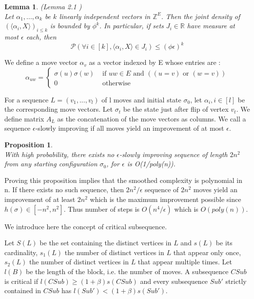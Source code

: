 \documentclass[12pt]{article}
\newtheorem{lemma}[theorem]{Lemma}
\newtheorem{proposition}[theorem]{Proposition}
\begin{document}
\begin{lemma} (Lemma 2.1 \cite{angel2016local})\\
\label{noise}
Let $\alpha_1, ..., \alpha_k$ be $k$ linearly independent vectors in $\mathbb{Z}^E$. Then the joint density of$ (\langle \alpha_i, X \rangle)_{i \leq k}$ is bounded by $\phi^k$. In particular, if sets $J_i \in \mathbb R$ have measure at most $\epsilon$ each, then 
\begin{equation*}
\mathcal{P} (\forall i \in [k], \langle \alpha_i, X \rangle \in J_i) \leq (\phi \epsilon)^k
\end{equation*}
\end{lemma}

We define a move vector $\alpha_v$ as a vector indexed by E whose entries are :
\begin{equation*}
\alpha_{uw} = 
\begin{cases}
\sigma(u)\sigma(w) &\text{ if } uw \in E \text{ and }( (u = v) \text{ or } (w = v)) \\
 0 &\text{ otherwise}
 \end{cases}
\end{equation*} 

For a sequence $L = (v_1, ..., v_l)$ of l moves and initial state $\sigma_0$, let $\alpha_i, i \in [l]$ be the corresponding move vectors. Let $\sigma_t$ be the state just after flip of vertex $v_t$. We define matrix $A_L$ as the concatenation of the move vectors as columns. We call a sequence $\epsilon$-slowly improving if all moves yield an improvement of at most $\epsilon$.

\begin{proposition}
\label{prop} \leavevmode \\
With high probability, there exists no $\epsilon$-slowly improving sequence of length $2n^2$ from any starting configuration $\sigma_0$, for $\epsilon$ is O(1/poly(n)).
\end{proposition}

Proving this proposition implies that the smoothed complexity is polynomial in n. If there exists no such sequence, then $2n^2/\epsilon$ sequence of $2n^2$ moves yield an improvement of at least $2n^2$ which is the maximum improvement possible since $h(\sigma) \in [-n^2,n^2]$. Thus number of steps is $O(n^4/\epsilon)$ which is $O(poly(n))$.

We introduce here the concept of critical subsequence.

Let $S(L)$ be the set containing the distinct vertices in $L$ and $s(L)$ be its cardinality, $s_1(L)$ the number of distinct vertices in $L$ that appear only once, $s_2(L)$ the number of distinct vertices in $L$ that appear multiple times. Let $l(B)$ be the length of the block, i.e. the number of moves.
A subsequence $CSub$ is critical if $l(CSub) \geq (1 + \beta)s(CSub)$ and every subsequence $Sub'$ strictly contained in $CSub$ has $l(Sub') < (1+\beta)s(Sub')$.
\end{document}

